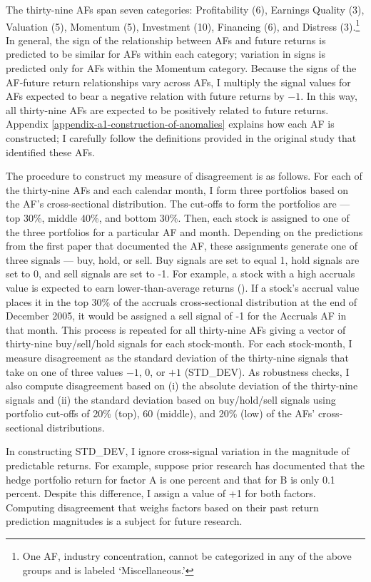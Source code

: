 \documentclass[
  12pt,
  a4paper,
  twoside,
  onecolumn]{article}
\begin{document}
The thirty-nine AFs span seven categories: Profitability (6), Earnings
Quality (3), Valuation (5), Momentum (5), Investment (10), Financing
(6), and Distress (3).\footnote{One AF, industry concentration, cannot
  be categorized in any of the above groups and is labeled
  `Miscellaneous.'} In general, the sign of the relationship between AFs
and future returns is predicted to be similar for AFs within each
category; variation in signs is predicted only for AFs within the
Momentum category. Because the signs of the AF-future return
relationships vary across AFs, I multiply the signal values for AFs
expected to bear a negative relation with future returns by \(-1\). In
this way, all thirty-nine AFs are expected to be positively related to
future returns. Appendix \ref{appendix-a1-construction-of-anomalies}
explains how each AF is constructed; I carefully follow the definitions
provided in the original study that identified these AFs.

The procedure to construct my measure of disagreement is as follows. For
each of the thirty-nine AFs and each calendar month, I form three
portfolios based on the AF's cross-sectional distribution. The cut-offs
to form the portfolios are --- top 30\%, middle 40\%, and bottom 30\%.
Then, each stock is assigned to one of the three portfolios for a
particular AF and month. Depending on the predictions from the first
paper that documented the AF, these assignments generate one of three
signals --- buy, hold, or sell. Buy signals are set to equal 1, hold
signals are set to 0, and sell signals are set to -1. For example, a
stock with a high accruals value is expected to earn lower-than-average
returns (\cite{sloan1996}). If a stock's accrual value places it in the
top 30\% of the accruals cross-sectional distribution at the end of
December 2005, it would be assigned a sell signal of -1 for the Accruals
AF in that month. This process is repeated for all thirty-nine AFs
giving a vector of thirty-nine buy/sell/hold signals for each
stock-month. For each stock-month, I measure disagreement as the
standard deviation of the thirty-nine signals that take on one of three
values \(-1\), \(0\), or \(+1\) (STD\_DEV). As robustness checks, I also
compute disagreement based on (i) the absolute deviation of the
thirty-nine signals and (ii) the standard deviation based on
buy/hold/sell signals using portfolio cut-offs of 20\% (top), 60
(middle), and 20\% (low) of the AFs' cross-sectional distributions.

In constructing STD\_DEV, I ignore cross-signal variation in the
magnitude of predictable returns. For example, suppose prior research
has documented that the hedge portfolio return for factor A is one
percent and that for B is only 0.1 percent. Despite this difference, I
assign a value of +1 for both factors. Computing disagreement that
weighs factors based on their past return prediction magnitudes is a
subject for future research.
\end{document}
